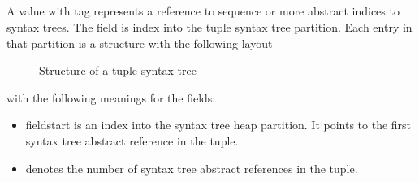 
\subsection{}
\label{sec:ifc:SyntaxSort:TypeTraitIntrinsic}



\subsection{}
\label{sec:ifc:SyntaxSort:Tuple}

A  value with tag  represents a reference
to sequence or more abstract indices to syntax trees. 
The  field is index into the tuple syntax tree partition.
Each entry in that partition is a structure with the following layout
%
\begin{figure}[H]
	\centering
	\caption{Structure of a tuple syntax tree}
	\label{fig:ifc-tuple-syntax-tree-structure}
\end{figure}
%
with the following meanings for the fields:
\begin{itemize}
	\item field{start} is an index into the syntax tree heap partition. It points to the first syntax tree abstract reference in the tuple.
	\item {} denotes the number of syntax tree abstract references in the tuple.
\end{itemize}

	
	
\subsection{}
\label{sec:ifc:SyntaxSort:AsmStatement}


\subsection{}
\label{sec:ifc:SyntaxSort:NamespaceAliasDefinition}

